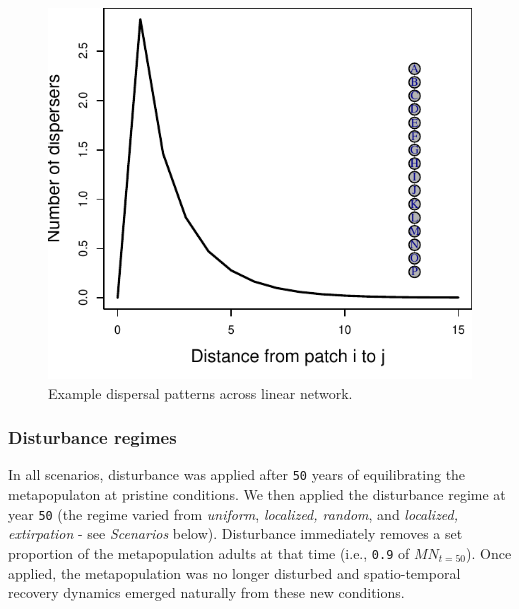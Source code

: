 \documentclass[
]{article}
\begin{document}
\begin{figure}[H]

{\centering \includegraphics{Managing_for_ecological_surprises_in_metapopulations_files/figure-latex/dispersal-1} 

}

\caption{Example dispersal patterns across linear network.}\label{fig:dispersal}
\end{figure}

\hypertarget{disturbance-regimes}{%
\subsubsection{Disturbance regimes}\label{disturbance-regimes}}

In all scenarios, disturbance was applied after \texttt{50} years of
equilibrating the metapopulaton at pristine conditions. We then applied
the disturbance regime at year \texttt{50} (the regime varied from
\emph{uniform}, \emph{localized, random}, and \emph{localized,
extirpation} - see \emph{Scenarios} below). Disturbance immediately
removes a set proportion of the metapopulation adults at that time
(i.e., \texttt{0.9} of \(MN_{t=50}\)). Once applied, the metapopulation
was no longer disturbed and spatio-temporal recovery dynamics emerged
naturally from these new conditions.
\end{document}

